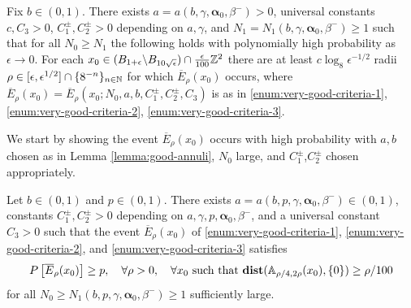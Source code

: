 \documentclass[12pt]{amsart}
\numberwithin{equation}{section}
\begin{document}
	\begin{lemma} \label{lemma:very-good-annuli}
		Fix $b \in (0,1)$. There exists $a = a(b,\gamma,\boldsymbol{\alpha}_0,\beta^-) > 0$, universal constants $c, C_3 > 0$, $C^{\pm}_1, C^{\pm}_2 > 0$ depending on $a, \gamma$, and $N_1 = N_1(b,\gamma,\boldsymbol{\alpha}_0,\beta^-) \geq 1$ such that for all $N_0  \geq N_1 $ the following holds with polynomially high probability as $\epsilon \to 0$. For each $x_0 \in (B_{1 + \epsilon} \backslash B_{10 \sqrt{\epsilon}}) \cap \frac{\epsilon}{100} \mathbb{Z}^2$ there are at least $c \log_8 \epsilon^{-1/2}$ radii $\rho \in [\epsilon, \epsilon^{1/2}] \cap %
		\{8^{-n}\}_{n \in \N}$ for which $\overline E_\rho(x_0)$ occurs, where $\overline E_\rho(x_0) = \overline E_\rho(x_0; N_0, a, b,C^{\pm}_1, C^{\pm}_2, C_3)$ is as in \ref{enum:very-good-criteria-1}, 	\ref{enum:very-good-criteria-2}, 	\ref{enum:very-good-criteria-3}.
		
	\end{lemma}
	
	We start by showing the event $\overline E_\rho(x_0)$ occurs with high probability 
	with $a,b$ chosen as in Lemma \ref{lemma:good-annuli},  $N_0$ large, and $C^{\pm}_1$,$C^{\pm}_2$
	chosen appropriately. 
	
	
	\begin{lemma} \label{lemma:very-good-annuli-hit}
		Let $b \in (0,1)$ and $p \in (0,1)$.
		There exists $a = a(b,p,\gamma,\boldsymbol{\alpha}_0,\beta^-) \in (0,1)$, constants $C^{\pm}_1, C^{\pm}_2>0$ depending on $a,\gamma,p,\boldsymbol{\alpha}_0,\beta^-$,
		and a universal constant $C_3>0$ such that the event $\overline E_\rho(x_0)$ of \ref{enum:very-good-criteria-1}, \ref{enum:very-good-criteria-2}, and \ref{enum:very-good-criteria-3} satisfies 
		\[
		P\left[ \overline E_\rho(x_0) \right] \geq p ,\quad \forall \rho > 0,\quad \forall x_0 \mbox{ such that $\mathop{\bf dist{}}(\mathbb{A}_{\rho/4, 2 \rho}(x_0), \{0\}) \geq \rho/100$}
		\]
		for all $N_0 \geq N_1(b,p,\gamma,\boldsymbol{\alpha}_0,\beta^-) \geq 1$ sufficiently large. 
	\end{lemma}
	
\end{document}
